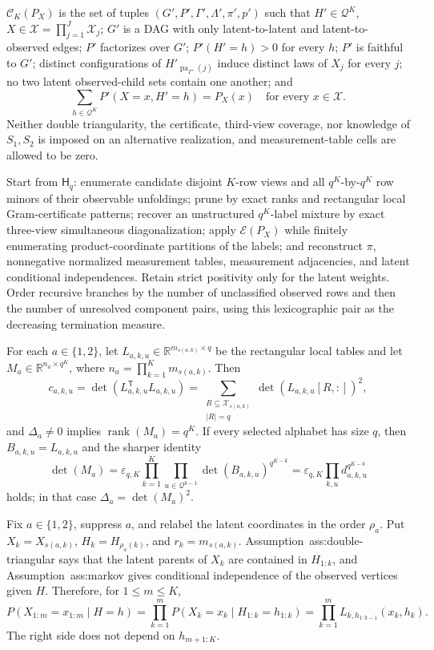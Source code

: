 \(\mathcal C_K(P_X)\) is the set of tuples \((G',P',\Gamma',\Lambda',\pi',p')\) such that \(H'\in\mathcal Q^K\), \(X\in\mathcal X=\prod_{j=1}^J\mathcal X_j\); \(G'\) is a DAG with only latent-to-latent and latent-to-observed edges; \(P'\) factorizes over \(G'\); \(P'(H'=h)>0\) for every \(h\); \(P'\) is faithful to \(G'\); distinct configurations of \(H'_{\operatorname{pa}_{\Gamma'}(j)}\) induce distinct laws of \(X_j\) for every \(j\); no two latent observed-child sets contain one another; and
\[
 \sum_{h\in\mathcal Q^K}P'(X=x,H'=h)=P_X(x)
 \quad\text{for every }x\in\mathcal X.
\]
Neither double triangularity, the certificate, third-view coverage, nor knowledge of \(S_1,S_2\) is imposed on an alternative realization, and measurement-table cells are allowed to be zero.

Start from \(\mathsf H_q\): enumerate candidate disjoint \(K\)-row views and all \(q^K\)-by-\(q^K\) row minors of their observable unfoldings; prune by exact ranks and rectangular local Gram-certificate patterns; recover an unstructured \(q^K\)-label mixture by exact three-view simultaneous diagonalization; apply \(\mathcal E(P_X)\) while finitely enumerating product-coordinate partitions of the labels; and reconstruct \(\pi\), nonnegative normalized measurement tables, measurement adjacencies, and latent conditional independences.  Retain strict positivity only for the latent weights.  Order recursive branches by the number of unclassified observed rows and then the number of unresolved component pairs, using this lexicographic pair as the decreasing termination measure.

For each \(a\in\{1,2\}\), let \(L_{a,k,u}\in\mathbb R^{m_{s(a,k)}\times q}\) be the rectangular local tables and let \(M_a\in\mathbb R^{n_a\times q^K}\), where \(n_a=\prod_{k=1}^Km_{s(a,k)}\).  Then
\[
 c_{a,k,u}=\det(L_{a,k,u}^{\mathsf T}L_{a,k,u})
 =\sum_{\substack{R\subseteq\mathcal X_{s(a,k)}\\|R|=q}}
 \det(L_{a,k,u}[R,:])^2,
\]
and \(\Delta_a\neq0\) implies \(\operatorname{rank}(M_a)=q^K\).  If every selected alphabet has size \(q\), then \(B_{a,k,u}=L_{a,k,u}\) and the sharper identity
\[
 \det(M_a)=\varepsilon_{q,K}
 \prod_{k=1}^K\prod_{u\in\mathcal Q^{k-1}}
 \det(B_{a,k,u})^{q^{K-k}}
 =\varepsilon_{q,K}\prod_{k,u}d_{a,k,u}^{q^{K-k}}
\]
holds; in that case \(\Delta_a=\det(M_a)^2\).

Fix \(a\in\{1,2\}\), suppress \(a\), and relabel the latent coordinates in the order \(\rho_a\).  Put \(X_k=X_{s(a,k)}\), \(H_k=H_{\rho_a(k)}\), and \(r_k=m_{s(a,k)}\).  Assumption~\textnormal{ass:double-triangular} says that the latent parents of \(X_k\) are contained in \(H_{1:k}\), and Assumption~\textnormal{ass:markov} gives conditional independence of the observed vertices given \(H\).  Therefore, for \(1\le m\le K\),
\[
 P(X_{1:m}=x_{1:m}\mid H=h)
 =\prod_{k=1}^m
 P(X_k=x_k\mid H_{1:k}=h_{1:k})
 =\prod_{k=1}^mL_{k,h_{1:k-1}}(x_k,h_k).
\tag{1}
\]
The right side does not depend on \(h_{m+1:K}\).

